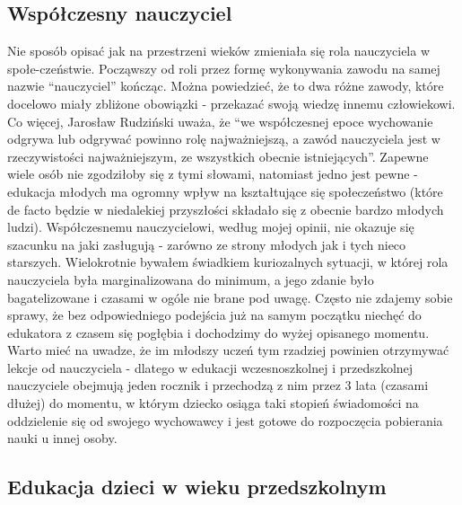 \documentclass{article}
\begin{document}
\subsection{Współczesny nauczyciel}

Nie sposób opisać jak na przestrzeni wieków zmieniała się rola nauczyciela w społe-czeństwie. Począwszy od roli przez formę wykonywania zawodu na samej nazwie “nauczyciel” kończąc. Można powiedzieć, że to dwa różne zawody, które docelowo miały zbliżone obowiązki - przekazać swoją wiedzę innemu człowiekowi. Co więcej, Jarosław Rudziński uważa, że “we współczesnej epoce wychowanie odgrywa lub odgrywać powinno rolę najważniejszą, a zawód nauczyciela jest w rzeczywistości najważniejszym, ze wszystkich obecnie istniejących”. Zapewne wiele osób nie zgodziłoby się z tymi słowami, natomiast jedno jest pewne - edukacja młodych ma ogromny wpływ na kształtujące się społeczeństwo (które de facto będzie w niedalekiej przyszłości składało się z obecnie bardzo młodych ludzi). Współczesnemu nauczycielowi, według mojej opinii, nie okazuje się szacunku na jaki zasługują - zarówno ze strony młodych jak i tych nieco starszych. Wielokrotnie bywałem świadkiem kuriozalnych sytuacji, w której rola nauczyciela była marginalizowana do minimum, a jego zdanie było bagatelizowane i czasami w ogóle nie brane pod uwagę. Często nie zdajemy sobie sprawy, że bez odpowiedniego podejścia już na samym początku niechęć do edukatora z czasem się pogłębia i dochodzimy do wyżej opisanego momentu. Warto mieć na uwadze, że im młodszy uczeń tym rzadziej powinien otrzymywać lekcje od nauczyciela - dlatego w edukacji wczesnoszkolnej i przedszkolnej nauczyciele obejmują jeden rocznik i przechodzą z nim przez 3 lata (czasami dłużej) do momentu, w którym dziecko osiąga taki stopień świadomości na oddzielenie się od swojego wychowawcy i jest gotowe do rozpoczęcia pobierania nauki u innej osoby.

\subsection{Edukacja dzieci w wieku przedszkolnym}
\end{document}
